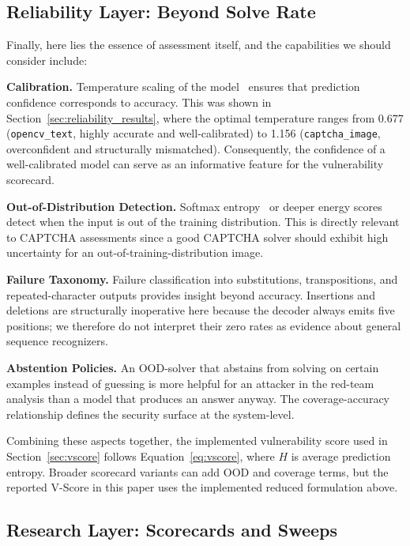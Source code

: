\documentclass[pdflatex,sn-mathphys-num,iicol]{sn-jnl}
\begin{document}
\subsection{Reliability Layer: Beyond Solve Rate}

Finally, here lies the essence of assessment itself, and the capabilities we should consider include:

\textbf{Calibration.} Temperature scaling of the model~\cite{guo2017calibration,naeini2015obtaining}
ensures that prediction confidence corresponds to accuracy. This was shown in
Section~\ref{sec:reliability_results}, where the optimal temperature ranges from
0.677 (\texttt{opencv\_text}, highly accurate and well-calibrated) to 1.156
(\texttt{captcha\_image}, overconfident and structurally mismatched).
Consequently, the confidence of a well-calibrated
model can serve as an informative feature for the vulnerability scorecard.

\textbf{Out-of-Distribution Detection.} Softmax entropy~\cite{hendrycks2017baseline,liang2018enhancing} or deeper energy scores~\cite{liu2020energy} detect when the input is out of the training distribution. This is directly relevant to CAPTCHA assessments since a good CAPTCHA solver should exhibit high uncertainty for an out-of-training-distribution image.

\textbf{Failure Taxonomy.} Failure classification into substitutions,
transpositions, and repeated-character outputs provides insight beyond
accuracy. Insertions and deletions are structurally inoperative here because
the decoder always emits five positions; we therefore do not interpret their
zero rates as evidence about general sequence recognizers.

\textbf{Abstention Policies.} An OOD-solver that abstains from solving on certain examples instead of guessing is more helpful for an attacker in the red-team analysis than a model that produces an answer anyway. The coverage-accuracy relationship defines the security surface at the system-level.

Combining these aspects together, the implemented vulnerability score used in
Section~\ref{sec:vscore} follows Equation~\ref{eq:vscore},
where $H$ is average prediction entropy. Broader scorecard variants can add
OOD and coverage terms, but the reported V-Score in this paper uses the
implemented reduced formulation above.

\subsection{Research Layer: Scorecards and Sweeps}
\end{document}

